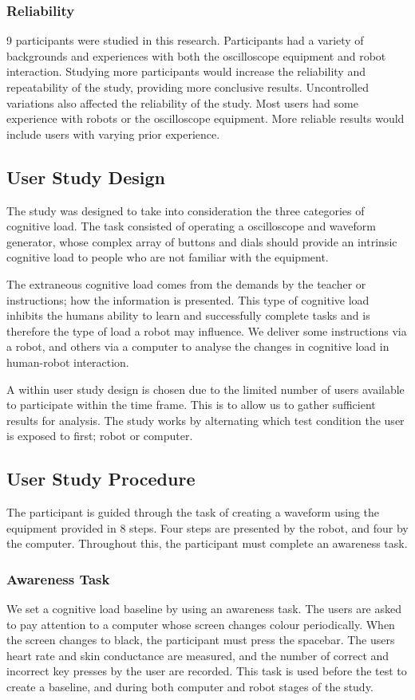 \documentclass[conference]{IEEEtran}
\begin{document}
\subsubsection{Reliability}
9 participants were studied in this research. Participants had a variety of backgrounds and experiences with both the oscilloscope equipment and robot interaction. Studying more participants would increase the reliability and repeatability of the study, providing more conclusive results. Uncontrolled variations also affected the reliability of the study. Most users had some experience with robots or the oscilloscope equipment. More reliable results would include users with varying prior experience.

\subsection{User Study Design}
The study was designed to take into consideration the three categories of cognitive load. The task consisted of operating a oscilloscope and waveform generator, whose complex array of buttons and dials should provide an intrinsic cognitive load to people who are not familiar with the equipment. 

The extraneous cognitive load comes from the demands by the teacher or instructions; how the information is presented. This type of cognitive load inhibits the humans ability to learn and successfully complete tasks and is therefore the type of load a robot may influence. We deliver some instructions via a robot, and others via a computer to analyse the changes in cognitive load in human-robot interaction.

A within user study design is chosen due to the limited number of users available to participate within the time frame. This is to allow us to gather sufficient results for analysis. The study works by alternating which test condition the user is exposed to first; robot or computer.

\subsection{User Study Procedure}
The participant is guided through the task of creating a waveform using the equipment provided in 8 steps. Four steps are presented by the robot, and four by the computer. Throughout this, the participant must complete an awareness task.

\subsubsection{Awareness Task}
We set a cognitive load baseline by using an awareness task. The users are asked to pay attention to a computer whose screen changes colour periodically. When the screen changes to black, the participant must press the spacebar. The users heart rate and skin conductance are measured, and the number of correct and incorrect key presses by the user are recorded.
This task is used before the test to create a baseline, and during both computer and robot stages of the study.
\end{document}
